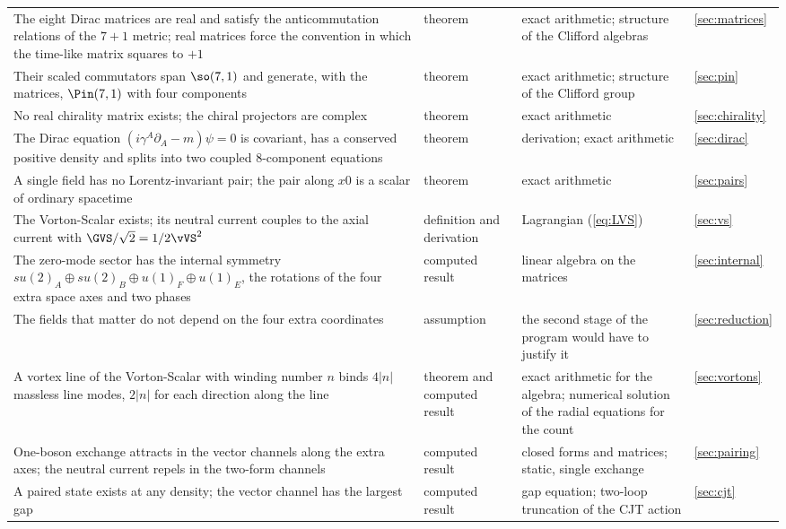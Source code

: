 \begin{table}
\begin{ruledtabular}
\begin{tabular}{>{\raggedright\arraybackslash}p{}>{\raggedright\arraybackslash}p{}>{\raggedright\arraybackslash}p{}>{\raggedright\arraybackslash}p{}}
The eight Dirac matrices are real and satisfy the anticommutation relations of the $7+1$ metric; real matrices force the convention in which the time-like matrix squares to $+1$ & theorem & exact arithmetic; structure of the Clifford algebras & \ref{sec:matrices} \\
Their scaled commutators span $\so(7,1)$ and generate, with the matrices, $\Pin(7,1)$ with four components & theorem & exact arithmetic; structure of the Clifford group & \ref{sec:pin} \\
No real chirality matrix exists; the chiral projectors are complex & theorem & exact arithmetic & \ref{sec:chirality} \\
The Dirac equation $(i\gamma^A\partial_A-m)\psi=0$ is covariant, has a conserved positive density and splits into two coupled 8-component equations & theorem & derivation; exact arithmetic & \ref{sec:dirac} \\
A single field has no Lorentz-invariant pair; the pair along $x0$ is a scalar of ordinary spacetime & theorem & exact arithmetic & \ref{sec:pairs} \\
The Vorton-Scalar exists; its neutral current couples to the axial current with $\GVS/\sqrt2=1/2\vVS^2$ & definition and derivation & Lagrangian (\ref{eq:LVS}) & \ref{sec:vs} \\
The zero-mode sector has the internal symmetry $su(2)_A\oplus su(2)_B\oplus u(1)_F\oplus u(1)_E$, the rotations of the four extra space axes and two phases & computed result & linear algebra on the matrices & \ref{sec:internal} \\
The fields that matter do not depend on the four extra coordinates & assumption & the second stage of the program would have to justify it & \ref{sec:reduction} \\
A vortex line of the Vorton-Scalar with winding number $n$ binds $4|n|$ massless line modes, $2|n|$ for each direction along the line & theorem and computed result & exact arithmetic for the algebra; numerical solution of the radial equations for the count & \ref{sec:vortons} \\
One-boson exchange attracts in the vector channels along the extra axes; the neutral current repels in the two-form channels & computed result & closed forms and matrices; static, single exchange & \ref{sec:pairing} \\
A paired state exists at any density; the vector channel has the largest gap & computed result & gap equation; two-loop truncation of the CJT action & \ref{sec:cjt} \\

\end{tabular}
\end{ruledtabular}
\end{table}
